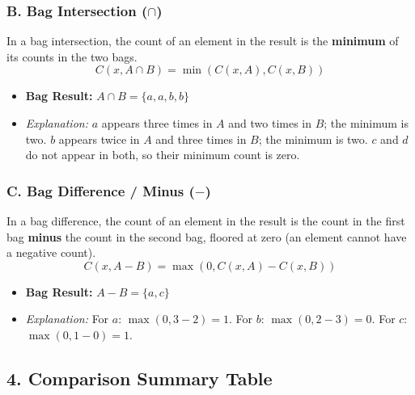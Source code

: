 \documentclass[12pt,a3paper]{article}
\begin{document}
\begin{enumerate}
\begin{tcolorbox}[enhanced,breakable,ansbox,colback=cA!4,colframe=cA,boxrule=0.8pt,arc=5pt,title={\textbf{Answer}},fonttitle=\bfseries\color{white},colbacktitle=cA]
\subsubsection*{B. Bag Intersection ($\cap$)}
In a bag intersection, the count of an element in the result is the \textbf{minimum} of its counts in the two bags.
$$C(x, A \cap B) = \min(C(x, A), C(x, B))$$
\begin{itemize}
    \item \textbf{Bag Result:} $A \cap B = \{a, a, b, b\}$
    \item \textit{Explanation:} $a$ appears three times in $A$ and two times in $B$; the minimum is two. $b$ appears twice in $A$ and three times in $B$; the minimum is two. $c$ and $d$ do not appear in both, so their minimum count is zero.
\end{itemize}

\subsubsection*{C. Bag Difference / Minus ($-$)}
In a bag difference, the count of an element in the result is the count in the first bag \textbf{minus} the count in the second bag, floored at zero (an element cannot have a negative count).
$$C(x, A - B) = \max(0, C(x, A) - C(x, B))$$
\begin{itemize}
    \item \textbf{Bag Result:} $A - B = \{a, c\}$
    \item \textit{Explanation:} For $a$: $\max(0, 3 - 2) = 1$. For $b$: $\max(0, 2 - 3) = 0$. For $c$: $\max(0, 1 - 0) = 1$. 
\end{itemize}

\subsection*{4. Comparison Summary Table}


\end{tcolorbox}
\end{enumerate}
\end{document}
